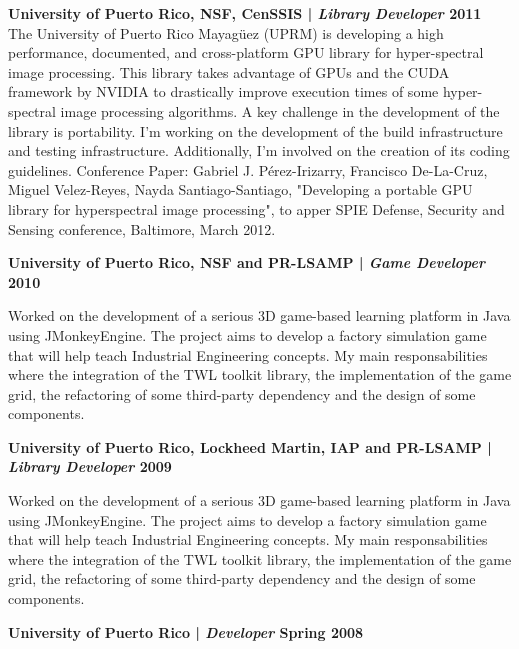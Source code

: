 \documentclass[margin,line]{res}
\begin{document}
\begin{resume}
{\bf University of Puerto Rico, NSF, CenSSIS  | {\em Library Developer} \hfill {\bf 2011 \\} }
\vspace{-.01cm}
The University of Puerto Rico Mayagüez (UPRM) is developing a high performance, documented, and cross-platform GPU library for hyper-spectral image processing. This library takes advantage of GPUs and the CUDA framework by NVIDIA to drastically improve execution times of some hyper-spectral image processing algorithms. A key challenge in the development of the library is portability. I'm working on the development of the build infrastructure and testing infrastructure. Additionally, I'm involved on the creation of its coding guidelines. Conference Paper: Gabriel J. Pérez-Irizarry, Francisco De-La-Cruz, Miguel Velez-Reyes, Nayda Santiago-Santiago, "Developing a portable GPU library for hyperspectral image processing", to apper  SPIE Defense, Security and Sensing conference, Baltimore, March 2012.

{\bf University of Puerto Rico, NSF and PR-LSAMP | {\em Game Developer} \hfill {\bf 2010 \\} }
\vspace{-.01cm}

Worked on the development of a serious 3D game-based learning platform in Java using JMonkeyEngine. The project aims to develop a factory simulation game that will help teach Industrial Engineering concepts. My main responsabilities where the integration of the TWL toolkit library, the implementation of the game grid, the refactoring of some third-party dependency and the design of some components.

\clearpage

{\bf University of Puerto Rico, Lockheed Martin, IAP and PR-LSAMP | {\em Library Developer} \hfill {\bf 2009 \\} }
\vspace{-.01cm}

Worked on the development of a serious 3D game-based learning platform in Java using JMonkeyEngine. The project aims to develop a factory simulation game that will help teach Industrial Engineering concepts. My main responsabilities where the integration of the TWL toolkit library, the implementation of the game grid, the refactoring of some third-party dependency and the design of some components.

{\bf University of Puerto Rico | {\em Developer} \hfill {\bf Spring 2008 \\} }
\vspace{-.01cm}


\end{resume}
\end{document}
